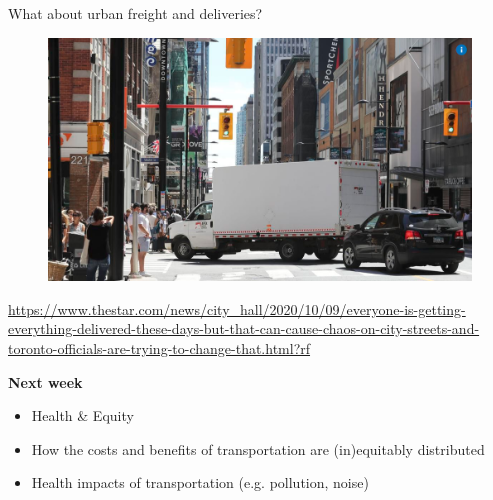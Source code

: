 \documentclass[aspectratio=169]{beamer}
\begin{document}
\begin{frame}
	
	What about urban freight and deliveries?
	
	\begin{figure}
		
		\includegraphics[width=0.87\linewidth]{images/delivery.png}
		
	\end{figure}

	\tiny \url{https://www.thestar.com/news/city_hall/2020/10/09/everyone-is-getting-everything-delivered-these-days-but-that-can-cause-chaos-on-city-streets-and-toronto-officials-are-trying-to-change-that.html?rf}
	
\end{frame}




\begin{frame}
	
	\textbf{Next week}
	
	\begin{itemize}
		\item Health \& Equity
		\item How the costs and benefits of transportation are (in)equitably distributed
		\item Health impacts of	transportation (e.g. pollution, noise)
	\end{itemize}
	
\end{frame}
\end{document}
